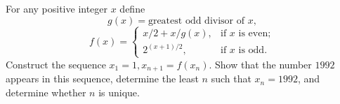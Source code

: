 For any positive integer $x$ define
\[ g(x) = \text{greatest odd divisor of } x, \]
\[ f(x) = \begin{cases} x/2 + x/g(x), & \text{if } x \text{ is even}; \\ 2^{(x+1)/2}, & \text{if } x \text{ is odd}. \end{cases} \]
Construct the sequence $x_1 = 1, x_{n+1} = f(x_n)$. Show that the number $1992$ appears in this sequence, determine the least $n$ such that $x_n = 1992$, and determine whether $n$ is unique.

